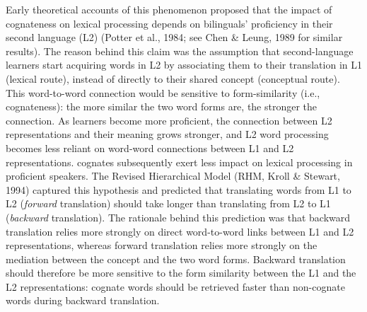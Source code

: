 \documentclass[
  english,
  man,floatsintext]{apa7}
\begin{document}
Early theoretical accounts of this phenomenon proposed that the impact of cognateness on lexical processing depends on bilinguals' proficiency in their second language (L2) (Potter et al., 1984; see Chen \& Leung, 1989 for similar results). The reason behind this claim was the assumption that second-language learners start acquiring words in L2 by associating them to their translation in L1 (lexical route), instead of directly to their shared concept (conceptual route). This word-to-word connection would be sensitive to form-similarity (i.e., cognateness): the more similar the two word forms are, the stronger the connection. As learners become more proficient, the connection between L2 representations and their meaning grows stronger, and L2 word processing becomes less reliant on word-word connections between L1 and L2 representations. cognates subsequently exert less impact on lexical processing in proficient speakers. The Revised Hierarchical Model (RHM, Kroll \& Stewart, 1994) captured this hypothesis and predicted that translating words from L1 to L2 (\emph{forward} translation) should take longer than translating from L2 to L1 (\emph{backward} translation). The rationale behind this prediction was that backward translation relies more strongly on direct word-to-word links between L1 and L2 representations, whereas forward translation relies more strongly on the mediation between the concept and the two word forms. Backward translation should therefore be more sensitive to the form similarity between the L1 and the L2 representations: cognate words should be retrieved faster than non-cognate words during backward translation.
\end{document}
